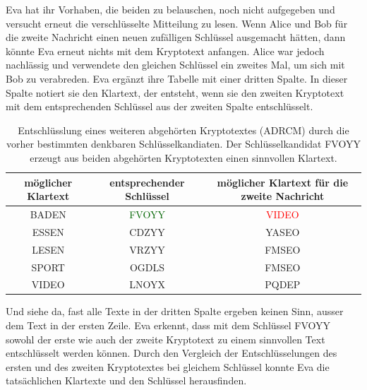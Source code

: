 Eva hat ihr Vorhaben, die beiden zu belauschen, noch nicht aufgegeben und versucht
erneut die verschlüsselte Mitteilung zu lesen. Wenn Alice und Bob für die zweite Nachricht einen neuen zufälligen Schlüssel ausgemacht hätten, dann könnte Eva erneut nichts mit dem Kryptotext anfangen. Alice war jedoch nachlässig und verwendete den gleichen
Schlüssel ein zweites Mal, um sich mit Bob zu verabreden.
Eva ergänzt ihre Tabelle mit einer dritten Spalte. In dieser Spalte notiert sie den Klartext,
der entsteht, wenn sie den zweiten Kryptotext mit dem entsprechenden Schlüssel aus der
zweiten Spalte entschlüsselt.
\begin{table}[H]
	\centering
	\begin{tabular}{c|c|c}
		möglicher Klartext & entsprechender Schlüssel     & möglicher Klartext für die zweite Nachricht \\ \hline
		BADEN              & \textcolor{DarkGreen}{FVOYY} & \textcolor{Red}{VIDEO}                      \\
		ESSEN              & CDZYY                        & YASEO                                       \\
		LESEN              & VRZYY                        & FMSEO                                       \\
		SPORT              & OGDLS                        & FMSEO                                       \\
		VIDEO              & LNOYX                        & PQDEP
	\end{tabular}
	\caption{Entschlüsslung eines weiteren abgehörten Kryptotextes (ADRCM) durch die vorher bestimmten denkbaren Schlüsselkandiaten. Der Schlüsselkandidat FVOYY erzeugt aus beiden abgehörten Kryptotexten einen sinnvollen Klartext.}
	\label{tab:ADRCM}
\end{table}
\noindent
Und siehe da, fast alle Texte in der dritten Spalte ergeben keinen Sinn, ausser dem Text
in der ersten Zeile. Eva erkennt, dass mit dem Schlüssel FVOYY sowohl der erste wie auch
der zweite Kryptotext zu einem sinnvollen Text entschlüsselt werden können. Durch den
Vergleich der Entschlüsselungen des ersten und des zweiten Kryptotextes bei gleichem
Schlüssel konnte Eva die tatsächlichen Klartexte und den Schlüssel herausfinden.

\clearpage
